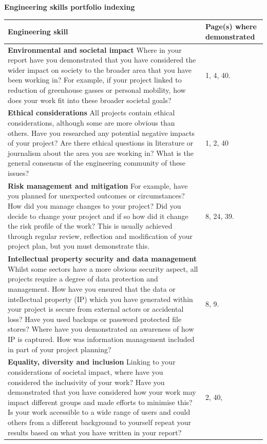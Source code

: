 \documentclass[11pt, a4paper]{report}
\begin{document}
\noindent\textbf{Engineering skills portfolio indexing}

\vspace{1em}
\noindent\begin{tabular}{|p{}|p{}|}
\hline
\textbf{Engineering skill} & \textbf{Page(s) where demonstrated} \\
\hline
\textbf{Environmental and societal impact} Where in your report have you demonstrated that you have considered the wider impact on society to the broader area that you have been working in? For example, if your project linked to reduction of greenhouse gasses or personal mobility, how does your work fit into these broader societal goals? & 1, 4, 40. \\
\hline
\textbf{Ethical considerations} All projects contain ethical considerations, although some are more obvious than others. Have you researched any potential negative impacts of your project? Are there ethical questions in literature or journalism about the area you are working in? What is the general consensus of the engineering community of these issues? & 1, 2, 40\\
\hline
\textbf{Risk management and mitigation} For example, have you planned for unexpected outcomes or circumstances? How did you manage changes to your project? Did you decide to change your project and if so how did it change the risk profile of the work? This is usually achieved through regular review, reflection and modification of your project plan, but you must demonstrate this. & 8, 24, 39.\\
\hline
\textbf{Intellectual property security and data management} Whilst some sectors have a more obvious security aspect, all projects require a degree of data protection and management. How have you ensured that the data or intellectual property (IP) which you have generated within your project is secure from external actors or accidental loss? Have you used backups or password protected file stores? Where have you demonstrated an awareness of how IP is captured. How was information management included in part of your project planning? & 8, 9.\\
\hline
\textbf{Equality, diversity and inclusion} Linking to your considerations of societal impact, where have you considered the inclusivity of your work? Have you demonstrated that you have considered how your work may impact different groups and made efforts to minimise this? Is your work accessible to a wide range of users and could others from a different background to yourself repeat your results based on what you have written in your report? & 2, 40, \\

\end{tabular}
\end{document}
